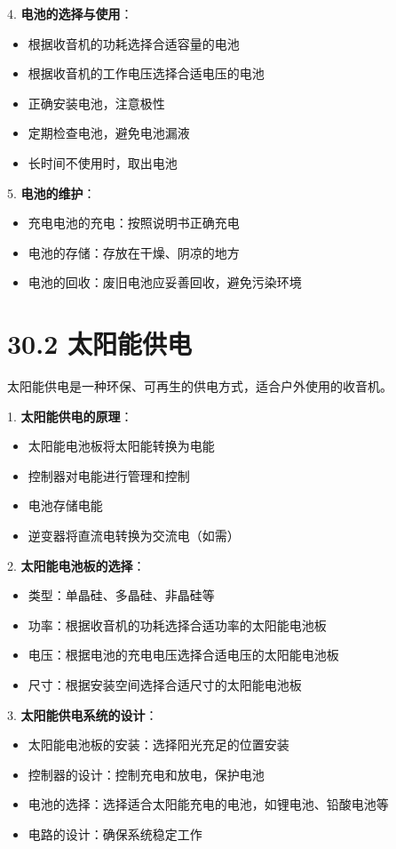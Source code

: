 \documentclass[12pt,UTF8]{ctexbook}
\begin{document}
4. \textbf{电池的选择与使用}：
   \begin{itemize}[leftmargin=3.5em]
   \item 根据收音机的功耗选择合适容量的电池
   \item 根据收音机的工作电压选择合适电压的电池
   \item 正确安装电池，注意极性
   \item 定期检查电池，避免电池漏液
   \item 长时间不使用时，取出电池
   \end{itemize}

5. \textbf{电池的维护}：
   \begin{itemize}[leftmargin=3.5em]
   \item 充电电池的充电：按照说明书正确充电
   \item 电池的存储：存放在干燥、阴凉的地方
   \item 电池的回收：废旧电池应妥善回收，避免污染环境
   \end{itemize}

\section*{30.2 太阳能供电}

太阳能供电是一种环保、可再生的供电方式，适合户外使用的收音机。

1. \textbf{太阳能供电的原理}：
   \begin{itemize}[leftmargin=3.5em]
   \item 太阳能电池板将太阳能转换为电能
   \item 控制器对电能进行管理和控制
   \item 电池存储电能
   \item 逆变器将直流电转换为交流电（如需）
   \end{itemize}

2. \textbf{太阳能电池板的选择}：
   \begin{itemize}[leftmargin=3.5em]
   \item 类型：单晶硅、多晶硅、非晶硅等
   \item 功率：根据收音机的功耗选择合适功率的太阳能电池板
   \item 电压：根据电池的充电电压选择合适电压的太阳能电池板
   \item 尺寸：根据安装空间选择合适尺寸的太阳能电池板
   \end{itemize}

3. \textbf{太阳能供电系统的设计}：
   \begin{itemize}[leftmargin=3.5em]
   \item 太阳能电池板的安装：选择阳光充足的位置安装
   \item 控制器的设计：控制充电和放电，保护电池
   \item 电池的选择：选择适合太阳能充电的电池，如锂电池、铅酸电池等
   \item 电路的设计：确保系统稳定工作
   \end{itemize}
\end{document}
